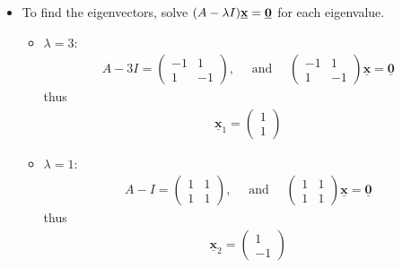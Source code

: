 \documentclass[10pt,a4paper]{article}
\begin{document}
\begin{itemize}
    \item To find the eigenvectors, solve $(A - \lambda I)\textbf{\underline{x}} =
    \textbf{\underline{0}}$ for each eigenvalue.
    \begin{itemize}
        \item $\lambda = 3$:
        \begin{align*}
            A-3 I=\left(\begin{array}{cc}
                -1 & 1 \\
                1 & -1
                \end{array}\right), \quad \text { and } \quad\left(\begin{array}{cc}
                -1 & 1 \\
                1 & -1
                \end{array}\right) \underline{\mathbf{x}}=\underline{\mathbf{0}}
        \end{align*}
        thus
        \begin{align*}
            \underline{\mathbf{x}}_{1}=\left(\begin{array}{l}
                1 \\
                1
                \end{array}\right)
        \end{align*}
        \item $\lambda = 1$:
        \begin{align*}
            A-I=\left(\begin{array}{ll}
                1 & 1 \\
                1 & 1
                \end{array}\right), \quad \text { and } \quad\left(\begin{array}{ll}
                1 & 1 \\
                1 & 1
                \end{array}\right) \underline{\mathbf{x}}=\underline{\mathbf{0}}
        \end{align*}
        thus
        \begin{align*}
            \underline{\mathbf{x}}_{2}=\left(\begin{array}{l}
                1 \\
                -1
                \end{array}\right)
        \end{align*}
    \end{itemize}
\end{itemize}
\end{document}
